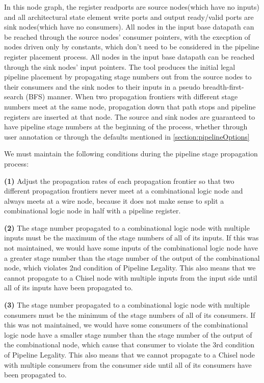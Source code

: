 In this node graph, the register readports are source nodes(which have no inputs) and all architectural state element write ports and output ready/valid ports are sink nodes(which have no consumers). All nodes in the input base datapath can be reached through the source nodes' consumer pointers, with the execption of nodes driven only by constants, which don't need to be considered in the pipeline register placement process. All nodes in the input base datapath can be reached through the sink nodes' input pointers. The tool produces the initial legal pipeline placement by propagating stage numbers out from the source nodes to their consumers and the sink nodes to their inputs in a pseudo breadth-first-search (BFS) manner. When two propagation frontiers with different stage numbers meet at the same node, propagation down that path stops and pipeline registers are inserted at that node. The source and sink nodes are guaranteed to have pipeline stage numbers at the beginning of the process, whether through user annotation or through the defaults mentioned in \ref{section:pipelineOptions}

We must maintain the following conditions during the pipeline stage propagation process:

{\bf (1)} Adjust the propagation rates of each propagation frontier so that two different propagation frontiers never meet at a combinational logic node and always meets at a wire node, because it does not make sense to split a combinational logic node in half with a pipeline register.

{\bf (2)}  The stage number propagated to a combinational logic node with multiple inputs must be the maximum of the stage numbers of all of its inputs. If this was not maintained, we would have some inputs of the combinational logic node have a greater stage number than the stage number of the output of the combinational node, which violates 2nd condition of Pipeline Legality. This also means that we cannot propagate to a Chisel node with multiple inputs from the input side until all of its inputs have been propagated to.

{\bf (3)} The stage number propagated to a combinational logic node with multiple consumers must be the minimum of the stage numbers of all of its consumers. If this was not maintained, we would have some consumers of the combinational logic node have a smaller stage number than the stage number of the output of the combinational node, which cause that consumer to violate the 3rd condition of Pipeline Legality. This also means that we cannot propagate to a Chisel node with multiple consumers from the consumer side until all of its consumers have been propagated to.


